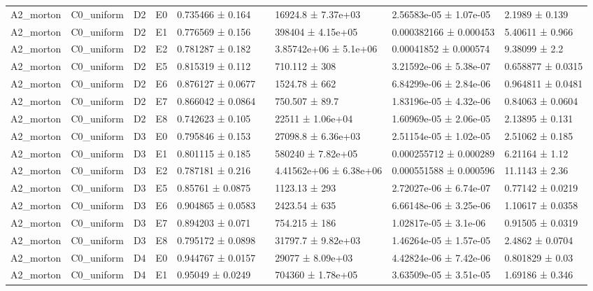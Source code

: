 \begin{table}
\begin{tabular}{lllllllll}
A2\_morton & C0\_uniform & D2 & E0 & 0.735466 ± 0.164 &  & 16924.8 ± 7.37e+03 & 2.56583e-05 ± 1.07e-05 & 2.1989 ± 0.139 \\
A2\_morton & C0\_uniform & D2 & E1 & 0.776569 ± 0.156 &  & 398404 ± 4.15e+05 & 0.000382166 ± 0.000453 & 5.40611 ± 0.966 \\
A2\_morton & C0\_uniform & D2 & E2 & 0.781287 ± 0.182 &  & 3.85742e+06 ± 5.1e+06 & 0.00041852 ± 0.000574 & 9.38099 ± 2.2 \\
A2\_morton & C0\_uniform & D2 & E5 & 0.815319 ± 0.112 &  & 710.112 ± 308 & 3.21592e-06 ± 5.38e-07 & 0.658877 ± 0.0315 \\
A2\_morton & C0\_uniform & D2 & E6 & 0.876127 ± 0.0677 &  & 1524.78 ± 662 & 6.84299e-06 ± 2.84e-06 & 0.964811 ± 0.0481 \\
A2\_morton & C0\_uniform & D2 & E7 & 0.866042 ± 0.0864 &  & 750.507 ± 89.7 & 1.83196e-05 ± 4.32e-06 & 0.84063 ± 0.0604 \\
A2\_morton & C0\_uniform & D2 & E8 & 0.742623 ± 0.105 &  & 22511 ± 1.06e+04 & 1.60969e-05 ± 2.06e-05 & 2.13895 ± 0.131 \\
A2\_morton & C0\_uniform & D3 & E0 & 0.795846 ± 0.153 &  & 27098.8 ± 6.36e+03 & 2.51154e-05 ± 1.02e-05 & 2.51062 ± 0.185 \\
A2\_morton & C0\_uniform & D3 & E1 & 0.801115 ± 0.185 &  & 580240 ± 7.82e+05 & 0.000255712 ± 0.000289 & 6.21164 ± 1.12 \\
A2\_morton & C0\_uniform & D3 & E2 & 0.787181 ± 0.216 &  & 4.41562e+06 ± 6.38e+06 & 0.000551588 ± 0.000596 & 11.1143 ± 2.36 \\
A2\_morton & C0\_uniform & D3 & E5 & 0.85761 ± 0.0875 &  & 1123.13 ± 293 & 2.72027e-06 ± 6.74e-07 & 0.77142 ± 0.0219 \\
A2\_morton & C0\_uniform & D3 & E6 & 0.904865 ± 0.0583 &  & 2423.54 ± 635 & 6.66148e-06 ± 3.25e-06 & 1.10617 ± 0.0358 \\
A2\_morton & C0\_uniform & D3 & E7 & 0.894203 ± 0.071 &  & 754.215 ± 186 & 1.02817e-05 ± 3.1e-06 & 0.91505 ± 0.0319 \\
A2\_morton & C0\_uniform & D3 & E8 & 0.795172 ± 0.0898 &  & 31797.7 ± 9.82e+03 & 1.46264e-05 ± 1.57e-05 & 2.4862 ± 0.0704 \\
A2\_morton & C0\_uniform & D4 & E0 & 0.944767 ± 0.0157 &  & 29077 ± 8.09e+03 & 4.42824e-06 ± 7.42e-06 & 0.801829 ± 0.03 \\
A2\_morton & C0\_uniform & D4 & E1 & 0.95049 ± 0.0249 &  & 704360 ± 1.78e+05 & 3.63509e-05 ± 3.51e-05 & 1.69186 ± 0.346 \\

\end{tabular}
\end{table}

